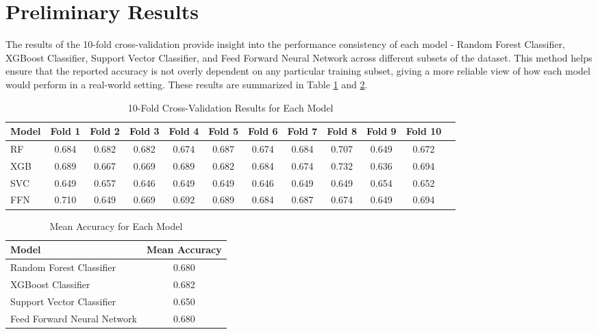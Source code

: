 \documentclass[11pt]{extarticle}
\begin{document}
\section{Preliminary Results} 
The results of the 10-fold cross-validation provide insight into the performance consistency of each model - Random Forest Classifier, XGBoost Classifier, Support Vector Classifier, and Feed Forward Neural Network across different subsets of the dataset. This method helps ensure that the reported accuracy is not overly dependent on any particular training subset, giving a more reliable view of how each model would perform in a real-world setting. These results are summarized in Table \ref*{'table:10foldcv-results'} and \ref{'table:mean_accuracy_table'}.
\begin{table}[h!]
    \centering
    \begin{tabular}{|l|c|c|c|c|c|c|c|c|c|c|c|}
        \hline
        \textbf{Model} & \textbf{Fold 1} & \textbf{Fold 2} & \textbf{Fold 3} & \textbf{Fold 4} & \textbf{Fold 5} & \textbf{Fold 6} & \textbf{Fold 7} & \textbf{Fold 8} & \textbf{Fold 9} & \textbf{Fold 10} \\
        \hline
        RF & 0.684 & 0.682 & 0.682 & 0.674 & 0.687 & 0.674 & 0.684 & 0.707 & 0.649 & 0.672 \\
        \hline
        XGB& 0.689 & 0.667 & 0.669 & 0.689 & 0.682 & 0.684 & 0.674 & 0.732 & 0.636 & 0.694 \\
        \hline
        SVC & 0.649 & 0.657 & 0.646 & 0.649 & 0.649 & 0.646 & 0.649 & 0.649 & 0.654 & 0.652 \\
        \hline
        FFN & 0.710 & 0.649 & 0.669 & 0.692 & 0.689 & 0.684 & 0.687 & 0.674 & 0.649 & 0.694 \\
        \hline
    \end{tabular}
    \caption{10-Fold Cross-Validation Results for Each Model}
    \label{'table:10foldcv-results'}
\end{table}

\begin{table}[h!]
    \centering
    \begin{tabular}{|l|c|}
        \hline
        \textbf{Model} & \textbf{Mean Accuracy} \\
        \hline
        Random Forest Classifier & 0.680 \\
        \hline
        XGBoost Classifier & 0.682 \\
        \hline
        Support Vector Classifier & 0.650 \\
        \hline
        Feed Forward Neural Network & 0.680 \\
        \hline
    \end{tabular}
    \caption{Mean Accuracy for Each Model}
    \label{'table:mean_accuracy_table'}
\end{table}
\end{document}
